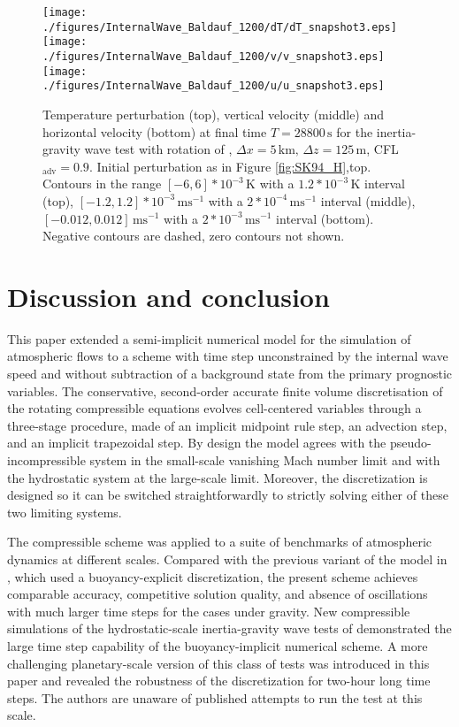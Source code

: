 \documentclass{ametsoc}
\theoremstyle{definition}
\begin{document}
\begin{figure}
\centering
 \texttt{[image: ./figures/InternalWave\_Baldauf\_1200/dT/dT\_snapshot3.eps]}
 \texttt{[image: ./figures/InternalWave\_Baldauf\_1200/v/v\_snapshot3.eps]}
 \texttt{[image: ./figures/InternalWave\_Baldauf\_1200/u/u\_snapshot3.eps]}
 \caption{Temperature perturbation (top), vertical velocity (middle) and horizontal velocity (bottom) at final time $T=28800\,\textrm{s}$ for the inertia-gravity wave test with rotation of \cite{BaldaufBrdar2013}, $\Delta x=5\,\textrm{km},\,\Delta z=125\,\textrm{m}$, CFL$_\textrm{adv}=0.9$. Initial perturbation as in Figure \ref{fig:SK94_H},top. Contours in the range $[-6, 6]*10^{-3}\,\textrm{K}$ with a $1.2*10^{-3}\,\textrm{K}$ interval (top), $[-1.2, 1.2]*10^{-3}\,\textrm{ms$^{-1}$}$  with a $2*10^{-4}\,\textrm{ms$^{-1}$}$ interval (middle), $[-0.012, 0.012]\,\textrm{ms$^{-1}$}$ with a $2*10^{-3}\,\textrm{ms$^{-1}$}$ interval (bottom). Negative contours are dashed, zero contours not shown.}
  \label{fig:BB13}
\end{figure}

\section{Discussion and conclusion}
\label{sec:Conclusions}	

This paper extended a semi-implicit numerical model for the simulation of atmospheric flows to a scheme with time step unconstrained by the internal wave speed and without subtraction of a background state from the primary prognostic variables. The conservative, second-order accurate finite volume discretisation of the rotating compressible equations evolves cell-centered variables through a three-stage procedure, made of an implicit midpoint rule step, an advection step, and an implicit trapezoidal step. By design the model agrees with the pseudo-incompressible system in the small-scale vanishing Mach number limit and with the hydrostatic system at the large-scale limit. Moreover, the discretization is designed so it can be switched straightforwardly to strictly solving either of these two limiting systems. 

The compressible scheme was applied to a suite of benchmarks of atmospheric dynamics at different scales. Compared with the previous variant of the model in \cite{Benacchio2014, BenacchioEtAl2014}, which used a buoyancy-explicit discretization, the present scheme achieves comparable accuracy, competitive solution quality, and absence of oscillations with much larger time steps for the cases under gravity. New compressible simulations of the hydrostatic-scale inertia-gravity wave tests of \citet{SkamarockKlemp1994} demonstrated the large time step capability of the buoyancy-implicit numerical scheme. A more challenging planetary-scale version of this class of tests was introduced in this paper and revealed the robustness of the discretization for two-hour long time steps. The authors are unaware of published attempts to run the test at this scale. 
\end{document}
